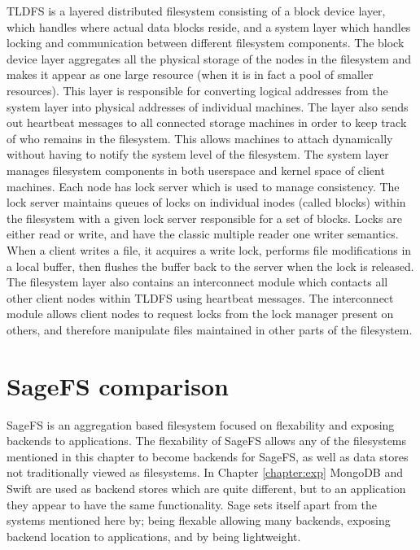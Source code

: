 TLDFS \cite{Wang2007} is a layered distributed filesystem consisting of a
block device layer, which handles where actual data blocks reside, and a
system layer which handles locking and communication between different
filesystem components. The block device layer aggregates all the physical
storage of the nodes in the filesystem and makes it appear as one large
resource (when it is in fact a pool of smaller resources). This layer is
responsible for converting logical addresses from the system layer into
physical addresses of individual machines. The layer also sends out heartbeat
messages to all connected storage machines in order to keep track of who
remains in the filesystem. This allows machines to attach dynamically without
having to notify the system level of the filesystem. The system layer manages
filesystem components in both userspace and kernel space of client machines.
Each node has lock server which is used to manage consistency. The lock server
maintains queues of locks on individual inodes (called blocks) within the
filesystem with a given lock server responsible for a set of blocks. Locks are
either read or write, and have the classic multiple reader one writer
semantics. When a client writes a file, it acquires a write lock, performs
file modifications in a local buffer, then flushes the buffer back to the
server when the lock is released. The filesystem layer also contains an
interconnect module which contacts all other client nodes within TLDFS using
heartbeat messages. The interconnect module allows client nodes to request
locks from the lock manager present on others, and therefore manipulate files
maintained in other parts of the filesystem.

\section{SageFS comparison}

SageFS is an aggregation based filesystem focused on flexability and exposing backends to applications. The flexability of SageFS allows any of the filesystems mentioned in this chapter to become backends for SageFS, as well as data stores not traditionally viewed as filesystems. In Chapter \ref{chapter:exp} MongoDB and Swift are used as backend stores which are quite different, but to an application they appear to have the same functionality. Sage sets itself apart from the systems mentioned here by; being flexable allowing many backends, exposing backend location to applications, and by being lightweight. 